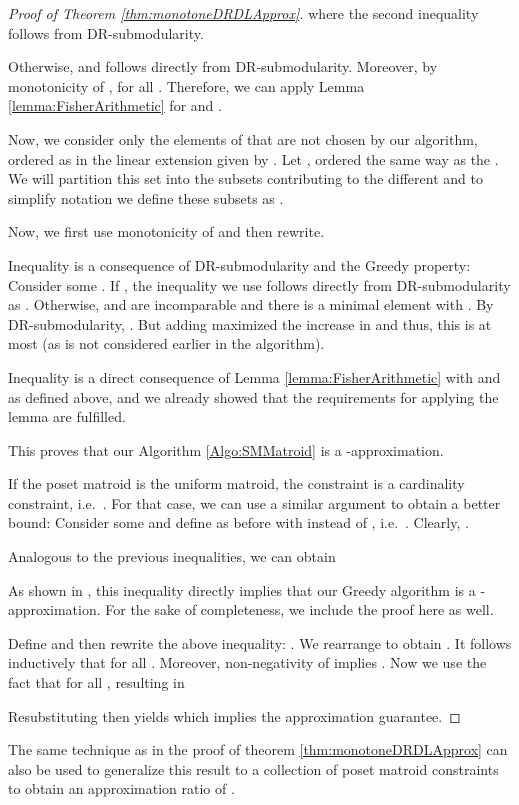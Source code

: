 \documentclass{article}
\theoremstyle{plain}
\theoremstyle{definition}
\begin{document}
\begin{proof}[Proof of Theorem \ref{thm:monotoneDRDLApprox}]
 where the second inequality follows from DR-submodularity.  
 
Otherwise,   and  follows directly from DR-submodularity. 
Moreover, by monotonicity of ,  for all . 
Therefore, we can apply Lemma \ref{lemma:FisherArithmetic} for  and . 

Now, we consider only the elements of  that are not chosen by our algorithm, 
ordered as in the linear extension given by . 
Let , ordered the same way as the . 
We will partition this set into the subsets contributing to the different 
and to simplify notation we define these subsets as
. 

Now, we first use monotonicity of  and then rewrite.


Inequality  is a consequence of DR-submodularity and the Greedy property: 
Consider some . 
If , the inequality we use follows directly from DR-submodularity
as . 
Otherwise,  and  are incomparable and there is a minimal element  with  . By DR-submodularity, . 
But adding  maximized the increase in  and thus, this is at most   
(as  is not considered earlier in the algorithm). 

Inequality  is a direct consequence of Lemma \ref{lemma:FisherArithmetic} with  and  as defined above, 
and we already showed that the requirements for applying the lemma are fulfilled. 

This proves that our Algorithm \ref{Algo:SMMatroid} is a -approximation. 

If the poset matroid is the uniform matroid, the constraint is a cardinality constraint, i.e.\ . 
For that case,  we can use a similar argument to obtain a better bound: 
Consider some  and define  as before with  instead of , i.e.\ . 
Clearly, . 

Analogous to the previous inequalities, we can obtain 

As shown in \cite{KrauseSurvey}, this inequality directly implies that our Greedy algorithm 
is a -approximation. 
For the sake of completeness, we include the proof here as well. 

Define  and then rewrite the above inequality:
. We rearrange to obtain
. 
 It follows inductively that  for all . Moreover, 
 non-negativity of  implies  . Now we use the fact that
  for all , resulting in

Resubstituting   then yields  which implies the approximation guarantee. 
\end{proof}


 The same technique as in the proof of theorem \ref{thm:monotoneDRDLApprox} can also be used to generalize this result to a collection of  poset matroid
 constraints to obtain an approximation ratio of . 
\end{document}
